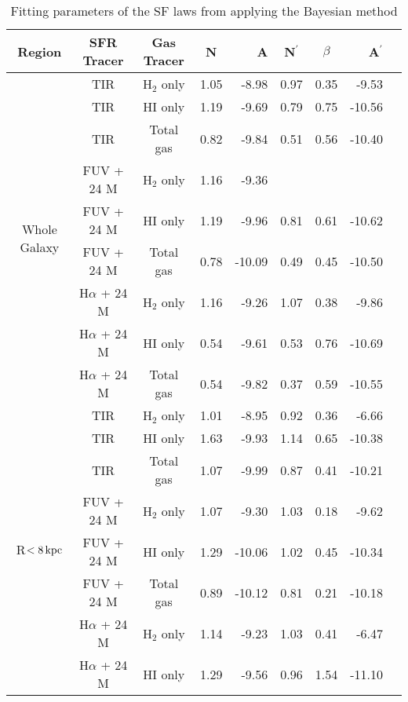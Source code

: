 \documentclass[useAMS,usenatbib]{mn2e}
\newcommand \kpc        {\,{\rm kpc}}
\newcommand \nprime {N$^\prime$}
\begin{document}
\begin{table*}
\caption{Fitting parameters of the SF laws from applying the Bayesian method}
\label{table:res}
\begin{tabular}{ccccrccrr}
\hline\hline
\multicolumn{1}{c}{\multirow{1}{*}{Region}} & SFR Tracer        & Gas Tracer & N    & A      & \nprime & $\beta$ & A$^\prime$ \\
\hline
\multicolumn{1}{c}{\multirow{9}{*}{Whole Galaxy}} & TIR               & H$_2$ only & 1.05 & -8.98  & 0.97    & 0.35    & -9.53      \\
 & TIR               & HI only    & 1.19 & -9.69  & 0.79    & 0.75    & -10.56     \\
 & TIR               & Total gas  & 0.82 & -9.84  & 0.51    & 0.56    & -10.40     \\
 & FUV + 24 M       & H$_2$ only & 1.16 & -9.36  &         &         &            \\
 & FUV + 24 M       & HI only    & 1.19 & -9.96  & 0.81    & 0.61    & -10.62     \\
 & FUV + 24 M       & Total gas  & 0.78 & -10.09 & 0.49    & 0.45    & -10.50     \\
 & H$\alpha$ + 24 M & H$_2$ only & 1.16 & -9.26  & 1.07    & 0.38    & -9.86      \\
 & H$\alpha$ + 24 M & HI only    & 0.54 & -9.61  & 0.53    & 0.76    & -10.69     \\
 & H$\alpha$ + 24 M & Total gas  & 0.54 & -9.82  & 0.37    & 0.59    & -10.55     \\
\hline
\multicolumn{1}{c}{\multirow{9}{*}{R$< 8\kpc$}} & TIR               & H$_2$ only & 1.01 & -8.95  & 0.92    & 0.36    & -6.66      \\
 & TIR               & HI only    & 1.63 & -9.93  & 1.14    & 0.65    & -10.38     \\
 & TIR               & Total gas  & 1.07 & -9.99  & 0.87    & 0.41    & -10.21     \\
 & FUV + 24 M       & H$_2$ only & 1.07 & -9.30  & 1.03    & 0.18    & -9.62      \\
 & FUV + 24 M       & HI only    & 1.29 & -10.06 & 1.02    & 0.45    & -10.34     \\
 & FUV + 24 M       & Total gas  & 0.89 & -10.12 & 0.81    & 0.21    & -10.18      \\
 & H$\alpha$ + 24 M & H$_2$ only & 1.14 & -9.23  & 1.03    & 0.41    & -6.47      \\
 & H$\alpha$ + 24 M & HI only    & 1.29 & -9.56  & 0.96    & 1.54    & -11.10     \\

\end{tabular}
\end{table*}
\end{document}
